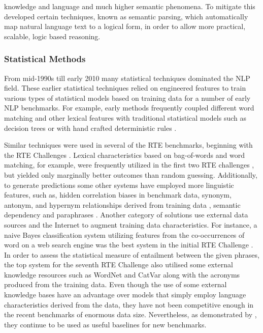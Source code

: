 knowledge and language and much higher semantic phenomena. To mitigate this \citep{kamath2018survey} developed certain techniques, known as semantic parsing, which automatically map natural language text to a logical form, in order to allow more practical, scalable, logic based reasoning.

\subsubsection{Statistical Methods}
\label{rte_methods_stat}


From mid-1990s till early 2010 many statistical techniques dominated the NLP field. These earlier statistical techniques relied on engineered features to train various types of statistical models based on training data for a number of early NLP benchmarks. For example, early methods frequently coupled different word matching and other lexical features with traditional statistical models such as decision trees \citep{ng2000machine} or with hand crafted deterministic rules \citep{charniak2000reading}.

Similar techniques were used in several of the RTE benchmarks, beginning with the RTE Challenges \citep{dagan2005pascal}. Lexical characteristics based on bag-of-words and word matching, for example, were frequently utilized in the first two RTE challenges \citep{dagan2005pascal,haim2006second}, but yielded only marginally better outcomes than random guessing. Additionally, to generate predictions some other systems have employed more linguistic features, such as, hidden correlation biases in benchmark data, synonym, antonym, and hypernym relationships derived from training data \citep{lai2014illinois}, semantic dependency and paraphrases \citep{hickl2006recognizing}. Another category of solutions use external data sources and the Internet to augment training data characteristics. For instance, a naive Bayes classification system utilizing features from the co-occurrences of word on a web search engine \citep{glickman2006applied} was the best system in the initial RTE Challenge \citep{dagan2005pascal}. In order to assess the statistical measure of entailment between the given phrases, the top system for the seventh RTE Challenge \citep{tsuchida2011ikoma} also utilised some external knowledge resources such as WordNet \citep{miller1995wordnet} and CatVar \citep{habash2003catvar} along with the acronyms produced from the training data. Even though the use of some external knowledge bases have an advantage over models that simply employ language characteristics derived from the data, they have not been competitive enough in the recent benchmarks of enormous data size. Nevertheless, as demonstrated by \citep{zhang2017ordinal}, they continue to be used as useful baselines for new benchmarks. 



